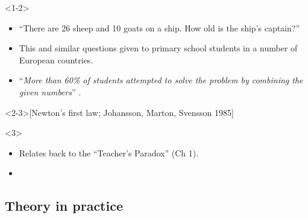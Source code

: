 \begin{frame}
  \begin{onlyenv}<1-2>
    \begin{remark}
      \begin{itemize}
        \item \enquote{There are 26 sheep and 10 goats on a ship.
          How old is the ship's captain?}
        \item This and similar questions given to primary school students in a 
          number of European countries.
        \item \enquote{\emph{More than 60\% of students attempted to solve the 
            problem by combining the given numbers}} .
      \end{itemize}
    \end{remark}
  \end{onlyenv}

  \begin{example}<2-3>[Newton's first law; Johansson, Marton, Svensson 1985]
  \end{example}

  \begin{onlyenv}<3>
    \begin{remark}
      \begin{itemize}
        \item Relates back to the \enquote{Teacher's Paradox} (Ch 1).
        \item {}
      \end{itemize}
    \end{remark}
  \end{onlyenv}
\end{frame}

\subsection{Theory in practice}

